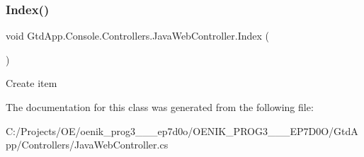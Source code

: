 \subsubsection{\texorpdfstring{Index()}{Index()}}
{\footnotesize\ttfamily void Gtd\+App.\+Console.\+Controllers.\+Java\+Web\+Controller.\+Index (\begin{DoxyParamCaption}{ }\end{DoxyParamCaption})}



Create item 



The documentation for this class was generated from the following file\+:\begin{DoxyCompactItemize}
\item 
C\+:/\+Projects/\+O\+E/oenik\+\_\+prog3\+\_\+\_\+\_\+ep7d0o/\+O\+E\+N\+I\+K\+\_\+\+P\+R\+O\+G3\+\_\+\_\+\_\+\+E\+P7\+D0\+O/\+Gtd\+App/\+Controllers/Java\+Web\+Controller.\+cs\end{DoxyCompactItemize}
